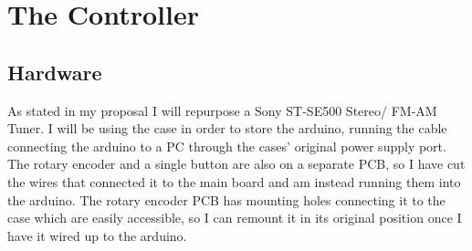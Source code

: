 \documentclass{article}
\begin{document}
    \newpage

    \section{The Controller}
        \subsection{Hardware}
            As stated in my proposal I will repurpose a Sony ST-SE500 Stereo/ FM-AM Tuner. I will be using the case in order to store the arduino, running the cable connecting the arduino to a PC through the cases' original power supply port. The rotary encoder and a single button are also on a separate PCB, so I have cut the wires that connected it to the main board and am instead running them into the arduino. The rotary encoder PCB has mounting holes connecting it to the case which are easily accessible, so I can remount it in its original position once I have it wired up to the arduino.
            
\end{document}
